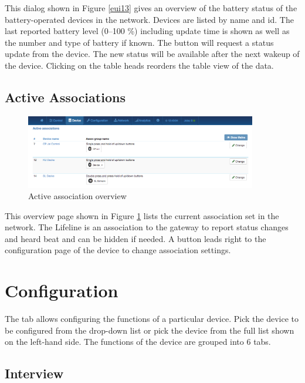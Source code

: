 This dialog shown in Figure \ref{eui13} gives an overview of the battery status of the 
battery-operated devices in the network. Devices are listed by name and id. The last 
reported battery level (0--100 \%) including update time is shown as well as the number 
and type of battery if known. The  button will request a status update 
from the device. The new status will be available after the next wakeup of the 
device. Clicking on the table heads reorders the table view of the data.

\subsection{Active Associations}

\begin{figure}
\begin{center}
\includegraphics[width=0.9\textwidth]{pngs/cap7/eui14.png}
\caption{Active association overview}
\label{eui14}
\end{center}
\end{figure}


This overview page shown in Figure \ref{eui14} lists the current association set in the 
network. The Lifeline is an association to the gateway to report status changes and heard 
beat and can be hidden if needed. A  button leads right to the configuration 
page of the device to change association settings.

\section{Configuration}
\label{Configuration}

The tab  allows configuring the functions of a particular device. Pick 
the device to be configured from the drop-down list or pick the device from the full list 
shown on the left-hand side. The functions of the device are grouped into 6 tabs.

\subsection{Interview}
\label{interview}

